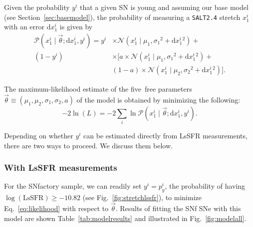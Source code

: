 \documentclass[]{aa}
\newcommand{\prob}[2]{\mathcal{P}\left( #1 \mid #2\right)}
\begin{document}
Given the probability $y^i$ that a given SN is young and assuming our base model
(see Section~\ref{sec:basemodel}), the probability of measuring a
\textsc{\texttt{SALT2.4}} stretch $x_1^i$ with an error $\mathrm{d}x_1^i$ is
given by
\begin{align}\label{eq:likelihoodsnf}
    \prob{x^i_1}{\vec{\theta}; \mathrm{d}x^i_1, y^i} =
    y^i & \times
    \mathcal{N}\left(x^i_1 \mid \mu_1, \sigma_1{}^2+\mathrm{d}x^i_1{}^2\right) +
    \nonumber\\
    (1-y^i) &\times \bigg[
    a \times \mathcal{N}\left(x^i_1 \mid \mu_1,
    \sigma_1{}^2+\mathrm{d}x^i_1{}^2\right) +
    \nonumber\\
    & (1-a) \times \mathcal{N}\left(x^i_1 \mid \mu_2,
    \sigma_2{}^{2}+\mathrm{d}x^i_1{}^2\right) \bigg].
\end{align}

The maximum-likelihood estimate of the five~free parameters
$\vec{\theta}\equiv({\mu_1, \mu_2, \sigma_1, \sigma_2,a})$ of the model is
obtained by minimizing the following:
\begin{equation}\label{eq:likelihood}
    -2\ln(L) = -2 \sum_i \ln \prob{x_1^i}{\vec{\theta};
    \mathrm{d}x_1^i, y^i}.
\end{equation}

Depending on whether $y^i$ can be estimated directly from LsSFR measurements,
there are two ways to proceed. We discuss them below.

\subsubsection{With LsSFR measurements}\label{sec:modelpy}

For the SNfactory sample, we can readily set $y^i = p^i_y$, the probability of
having $\log(\textrm{LsSFR}) \geq -10.82$ (see Fig.~\ref{fig:stretchlssfr}), to
minimize Eq.~\ref{eq:likelihood} with respect to $\vec{\theta}$. Results of
fitting the SNf SNe with this model are shown Table~\ref{tab:modelresults} and
illustrated in Fig.~\ref{fig:modelall}.
\end{document}
